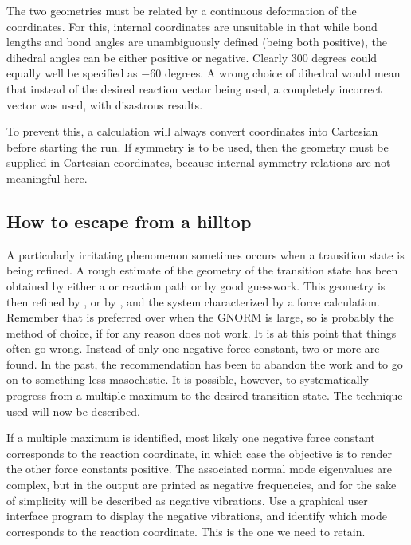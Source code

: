 The two geometries must be related by a continuous  deformation  of the  
coordinates. For this, internal  coordinates  are unsuitable in that while 
bond  lengths  and  bond  angles  are 
unambiguously  defined (being both positive), the dihedral angles can be either
positive or  negative.   Clearly  300  degrees  could  equally  well  be
specified  as  $-60$ degrees.  A wrong choice of dihedral would mean that
instead  of  the  desired  reaction  vector  being  used,  a  completely
incorrect vector was used, with disastrous results.

To prevent this, a  calculation will always convert coordinates
into Cartesian before starting the run.  If symmetry is to be used, then the
geometry must be supplied in Cartesian coordinates, because internal symmetry
relations are not meaningful here.

\subsection{How to escape from a hilltop}
A  particularly  irritating  phenomenon  sometimes  occurs  when  a transition 
state is being refined.  A rough estimate of the geometry of the transition
state has been obtained by either a    or  reaction path or by
good guesswork.  This geometry is then  refined by ,  or
by , and the system characterized by a force calculation.  Remember
that  is preferred over  when the GNORM is large, so
 is probably the method of choice, if for any reason  does
not work.    It  is  at this  point  that  things  often go wrong.  Instead of
only one negative force constant, two or more are found.  In the past, the 
recommendation has been to abandon the work and to go on to something less
masochistic. It is possible, however, to  systematically  progress  from  a 
multiple maximum to the desired transition state.  The technique used will now
be described.

If a multiple maximum is identified, most likely one negative force constant 
corresponds  to  the  reaction  coordinate,  in which case the objective  is 
to  render  the  other  force  constants  positive.   The associated  normal 
mode  eigenvalues are complex, but in the output are printed as negative
frequencies, and for the sake of simplicity will  be
 described  as  negative  vibrations. 
Use a graphical user interface program to display the negative vibrations, 
and  identify  which  mode  corresponds  to  the   reaction coordinate.  This
is the one we need to retain.

